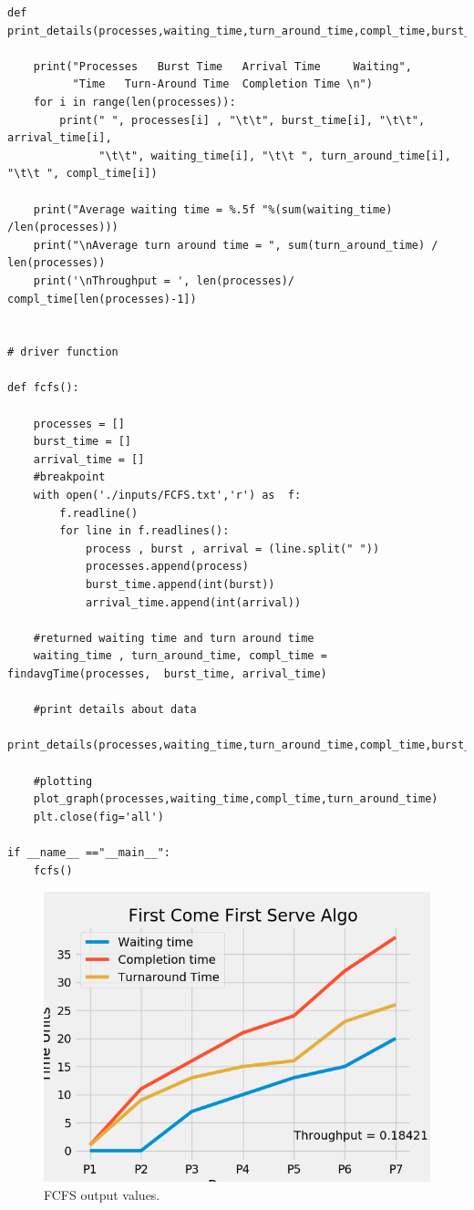 \documentclass[11pt,a4paper]{report}
\begin{document}
\begin{lstlisting}[columns=fullflexible,caption=FCFS Source Code,breaklines=true,postbreak=\mbox{\textcolor{red}{$\hookrightarrow$}\space}]
def print_details(processes,waiting_time,turn_around_time,compl_time,burst_time,arrival_time):
      
    print("Processes   Burst Time   Arrival Time     Waiting",  
          "Time   Turn-Around Time  Completion Time \n") 
    for i in range(len(processes)):
        print(" ", processes[i] , "\t\t", burst_time[i], "\t\t", arrival_time[i],  
              "\t\t", waiting_time[i], "\t\t ", turn_around_time[i], "\t\t ", compl_time[i])  
  
    print("Average waiting time = %.5f "%(sum(waiting_time) /len(processes))) 
    print("\nAverage turn around time = ", sum(turn_around_time) / len(processes))  
    print('\nThroughput = ', len(processes)/ compl_time[len(processes)-1])


# driver function

def fcfs():
 
    processes = []
    burst_time = []
    arrival_time = []
    #breakpoint
    with open('./inputs/FCFS.txt','r') as  f:
        f.readline()
        for line in f.readlines():
            process , burst , arrival = (line.split(" "))
            processes.append(process)
            burst_time.append(int(burst))
            arrival_time.append(int(arrival))

    #returned waiting time and turn around time
    waiting_time , turn_around_time, compl_time = findavgTime(processes,  burst_time, arrival_time)
    
    #print details about data
    print_details(processes,waiting_time,turn_around_time,compl_time,burst_time,arrival_time)

    #plotting 
    plot_graph(processes,waiting_time,compl_time,turn_around_time)
    plt.close(fig='all')

if __name__ =="__main__": 
    fcfs()
\end{lstlisting}

\begin{figure}[H]
	\centering
	\includegraphics[scale=0.8]{./img/FCFS_output.png}
	\caption{FCFS output values.}
\end{figure}
\end{document}
